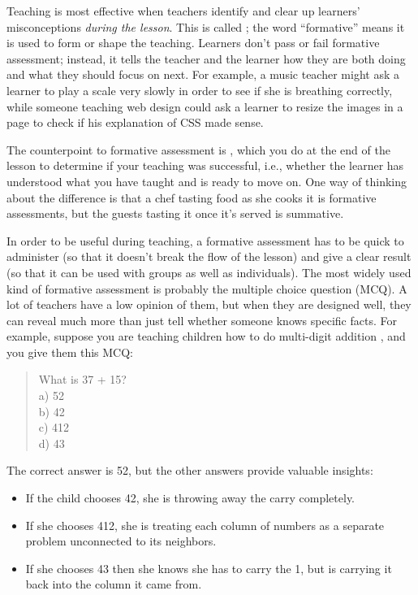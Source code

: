 Teaching is most effective when teachers identify and clear up
learners' misconceptions \emph{during the lesson}.  This is called
; the word
``formative'' means it is used to form or shape the teaching.
Learners don't pass or fail formative assessment; instead, it tells
the teacher and the learner how they are both doing and what they
should focus on next. For example, a music teacher might ask a learner
to play a scale very slowly in order to see if she is breathing
correctly, while someone teaching web design could ask a learner to
resize the images in a page to check if his explanation of CSS made
sense.

The counterpoint to formative assessment is
, which you do
at the end of the lesson to determine if your teaching was successful,
i.e., whether the learner has understood what you have taught and is
ready to move on.  One way of thinking about the difference is that a
chef tasting food as she cooks it is formative assessments, but the
guests tasting it once it's served is summative.

In order to be useful during teaching, a formative assessment has to
be quick to administer (so that it doesn't break the flow of the
lesson) and give a clear result (so that it can be used with groups as
well as individuals). The most widely used kind of formative
assessment is probably the multiple choice question (MCQ).  A lot of
teachers have a low opinion of them, but when they are designed well,
they can reveal much more than just tell whether someone knows
specific facts.  For example, suppose you are teaching children how to
do multi-digit addition \cite{Ojos2015}, and you give them this MCQ:

\begin{quote}

  What is 37 + 15? \\
  a) 52 \\
  b) 42 \\
  c) 412 \\
  d) 43

\end{quote}

\noindent
The correct answer is 52, but the other answers provide valuable
insights:

\begin{itemize}

\item
  If the child chooses 42, she is throwing away the carry completely.

\item
  If she chooses 412, she is treating each column of numbers as a
  separate problem unconnected to its neighbors.

\item
  If she chooses 43 then she knows she has to carry the 1, but is
  carrying it back into the column it came from.

\end{itemize}

